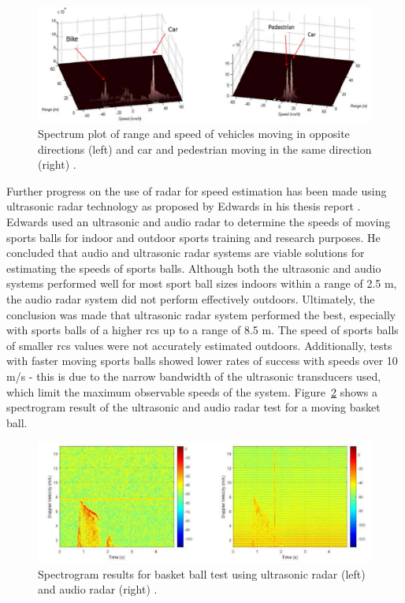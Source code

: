 \documentclass[class=report,11pt,crop=false]{standalone}
\begin{document}
\begin{figure}[htbp]
    \centering
    \includegraphics[width=0.6\columnwidth]{../Images/jeng_img.png}
    \caption{Spectrum plot of range and speed of vehicles moving in opposite directions (left) and car and pedestrian moving in the same direction (right)  \cite{jeng}.}
    \label{fig:jeng}
\end{figure}

Further progress on the use of radar for speed estimation has been made using ultrasonic \gls{radar} technology as proposed by Edwards in his thesis report \cite{ian}. Edwards used an ultrasonic and audio radar to determine the speeds of moving sports balls for indoor and outdoor sports training and research purposes. He concluded that audio and ultrasonic radar systems are viable solutions for estimating the speeds of sports balls. Although both the ultrasonic and audio systems performed well for most sport ball sizes indoors within a range of 2.5 m, the audio \gls{radar} system did not perform effectively outdoors. Ultimately, the conclusion was made that ultrasonic \gls{radar} system performed the best, especially with sports balls of a higher \gls{rcs} up to a range of 8.5 m. The speed of sports balls of smaller \gls{rcs} values were not accurately estimated outdoors. Additionally, tests with faster moving sports balls showed lower rates of success with speeds over 10 m/s - this is due to the narrow bandwidth of the ultrasonic transducers used, which limit the maximum observable speeds of the system. Figure~\ref{fig:ian-img} shows a spectrogram result of the ultrasonic and audio radar test for a moving basket ball.

\begin{figure}[htbp]
    \centering
    \includegraphics[width=0.6\columnwidth]{../Images/ian_img.png}
    \caption{Spectrogram results for basket ball test using ultrasonic \gls{radar} (left) and audio \gls{radar} (right) \cite{ian}.}
    \label{fig:ian-img}
\end{figure}
\end{document}
